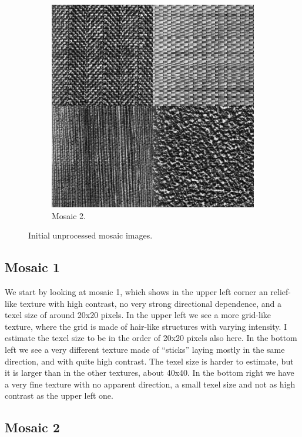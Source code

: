 \documentclass[a4paper]{article}
\begin{document}
\begin{figure}
\begin{subfigure}[b]{0.40\textwidth}
        \includegraphics[width=\textwidth]{mosaic2.png}
        \caption{%
            Mosaic 2.
        }
    \end{subfigure}
    \caption{%
        Initial unprocessed mosaic images.
    }
    \label{fig:raw_mosaic}
\end{figure}

\subsection{Mosaic 1}

We start by looking at mosaic 1, which shows in the upper left corner an
relief-like texture with high contrast, no very strong directional
dependence, and a texel size of around 20x20 pixels. In the upper left
we see a more grid-like texture, where the grid is made of hair-like
structures with varying intensity. I estimate the texel size to be in
the order of 20x20 pixels also here. In the bottom left we see a very
different texture made of “sticks” laying mostly in the same direction,
and with quite high contrast. The texel size is harder to estimate, but
it is larger than in the other textures, about 40x40. In the bottom
right we have a very fine texture with no apparent direction, a small
texel size and not as high contrast as the upper left one.

\subsection{Mosaic 2}
\end{document}
